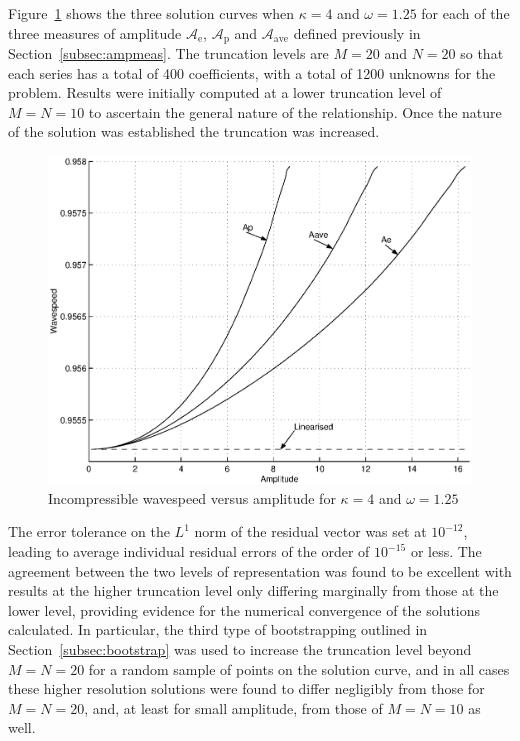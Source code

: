 Figure~\ref{fig:CvsAk4w125} shows the three solution curves when $\kappa=4$ and $\omega=1.25$ for each of the three measures of amplitude $\mathcal{A}_{\text{e}}$, $\mathcal{A}_{\text{p}}$ and $\mathcal{A}_{\text{ave}}$ defined previously in Section~\ref{subsec:ampmeas}. The truncation levels are $M=20$ and $N=20$ so that each series has a total of 400 coefficients, with a total of 1200 unknowns for the problem. Results were initially computed at a lower truncation level of $M=N=10$ to ascertain the general nature of the relationship. Once the nature of the solution was established the truncation was increased.

\begin{figure}[htbp]
	\centering
		\includegraphics[scale=0.75]{IMAGES/CvsAk4w125.eps}
	\caption{Incompressible wavespeed versus amplitude for $\kappa=4$ and $\omega=1.25$}
	\label{fig:CvsAk4w125}
\end{figure}
The error tolerance on the $L^1$ norm of the residual vector was set at $10^{-12}$, leading to average individual residual errors of the order of $10^{-15}$ or less. The agreement between the two levels of representation was found to be excellent with results at the higher truncation level only differing marginally from those at the lower level, providing evidence for the numerical convergence of the solutions calculated. In particular, the third type of bootstrapping outlined in Section~\ref{subsec:bootstrap} was used to increase the truncation level beyond $M=N=20$ for a random sample of points on the solution curve, and in all cases these higher resolution solutions were found to differ negligibly from those for $M=N=20$, and, at least for small amplitude, from those of $M=N=10$ as well.

